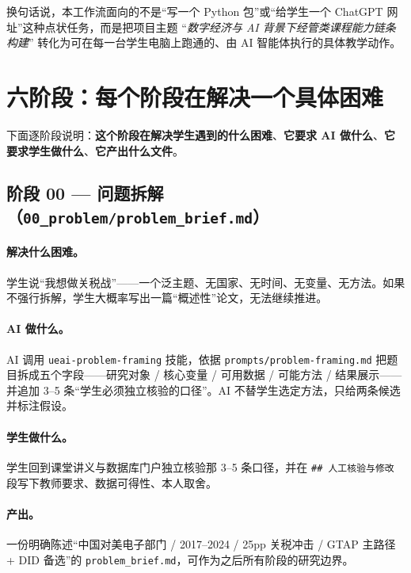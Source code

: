 \documentclass[12pt,a4paper]{article}
\begin{document}
\medskip
换句话说，本工作流面向的不是``写一个 Python 包''或``给学生一个 ChatGPT 网址''这种点状任务，而是把项目主题 ``\emph{数字经济与 AI 背景下经管类课程能力链条构建}'' 转化为可在每一台学生电脑上跑通的、由 AI 智能体执行的具体教学动作。

\section{六阶段：每个阶段在解决一个具体困难}\label{sec:six-stage}

下面逐阶段说明：\textbf{这个阶段在解决学生遇到的什么困难}、\textbf{它要求 AI 做什么}、\textbf{它要求学生做什么}、\textbf{它产出什么文件}。

\subsection{阶段 00 — 问题拆解（\texttt{00\_problem/problem\_brief.md}）}

\paragraph{解决什么困难。}学生说``我想做关税战''——一个泛主题、无国家、无时间、无变量、无方法。如果不强行拆解，学生大概率写出一篇``概述性''论文，无法继续推进。

\paragraph{AI 做什么。}AI 调用 \texttt{ueai-problem-framing} 技能，依据 \texttt{prompts/problem-framing.md} 把题目拆成五个字段——研究对象 / 核心变量 / 可用数据 / 可能方法 / 结果展示——并追加 3–5 条``学生必须独立核验的口径''。AI 不替学生选定方法，只给两条候选并标注假设。

\paragraph{学生做什么。}学生回到课堂讲义与数据库门户独立核验那 3–5 条口径，并在 \texttt{\#\# 人工核验与修改} 段写下教师要求、数据可得性、本人取舍。

\paragraph{产出。}一份明确陈述``中国对美电子部门 / 2017–2024 / 25pp 关税冲击 / GTAP 主路径 + DID 备选''的 \texttt{problem\_brief.md}，可作为之后所有阶段的研究边界。
\end{document}
